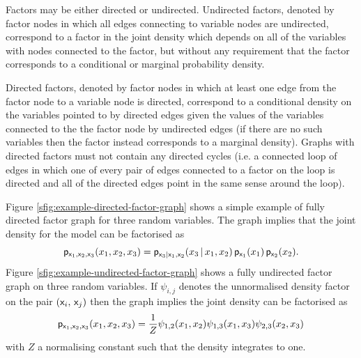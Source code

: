 Factors may be either directed or undirected. Undirected factors, denoted by factor nodes in which all edges connecting to variable nodes are undirected, correspond to a factor in the joint density which depends on all of the variables with nodes connected to the factor, but without any requirement that the factor corresponds to a conditional or marginal probability density. 

Directed factors, denoted by factor nodes in which at least one edge from the factor node to a variable node is directed, correspond to a conditional density on the variables pointed to by directed edges given the values of the variables connected to the the factor node by undirected edges (if there are no such variables then the factor instead corresponds to a marginal density). Graphs with directed factors must not contain any directed cycles (i.e. a connected loop of edges in which one of every pair of edges connected to a factor on the loop is directed and all of the directed edges point in the same sense around the loop). 

Figure \ref{sfig:example-directed-factor-graph} shows a simple example of fully directed factor graph for three random variables. The graph implies that the joint density for the model can be factorised as
\begin{equation}\label{eq:example-directed-graphical-model-factorisation}
  \mathsf{p}_{\mathsf{x}_1,\mathsf{x}_2,\mathsf{x}_3}(x_1,x_2,x_3) = 
  \mathsf{p}_{\mathsf{x}_3|\mathsf{x}_1,\mathsf{x}_2}(x_3 \operatorname{|} x_1,x_2) \,
  \mathsf{p}_{\mathsf{x}_1}(x_1) \, \mathsf{p}_{\mathsf{x}_2}(x_2).
\end{equation}
Figure \ref{sfig:example-undirected-factor-graph} shows a fully undirected factor graph on three random variables. If $\psi_{i,j}$ denotes the unnormalised density factor on the pair $(\mathsf{x}_i,\,\mathsf{x}_j)$ then the graph implies the joint density can be factorised as
\begin{equation}\label{eq:example-undirected-factor-graph-factorisation}
\begin{split}
  \mathsf{p}_{\mathsf{x}_1,\mathsf{x}_2,\mathsf{x}_3}(x_1,x_2,x_3) =
  \frac{1}{Z} 
  \psi_{1,2}(x_1,x_2)
  \psi_{1,3}(x_1,x_3)
  \psi_{2,3}(x_2,x_3)
\end{split}
\end{equation}
with $Z$ a normalising constant such that the density integrates to one.

